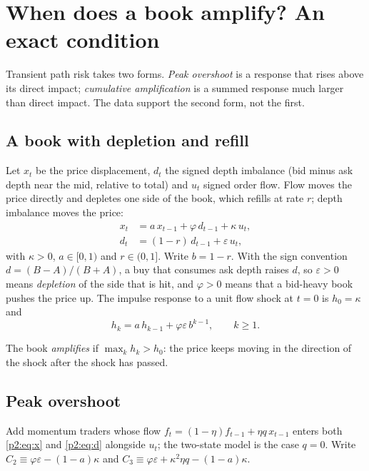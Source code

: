     \section{When does a book amplify? An exact condition}\label{p2:sec:t6}

    Transient path risk takes two forms. \emph{Peak overshoot} is a response that rises above its direct impact; \emph{cumulative amplification} is a summed response much larger than direct impact. The data support the second form, not the first.

    \subsection{A book with depletion and refill}
Let $x_t$ be the price displacement, $d_t$ the signed depth imbalance (bid minus ask depth near the mid, relative to total) and $u_t$ signed order flow. Flow moves the price directly and depletes one side of the book, which refills at rate $r$; depth imbalance moves the price:
\begin{align}
x_t &= a\,x_{t-1} + \varphi\,d_{t-1} + \kappa\,u_t, \label{p2:eq:x}\\
d_t &= (1-r)\,d_{t-1} + \varepsilon\,u_t, \label{p2:eq:d}
\end{align}
with $\kappa>0$, $a\in[0,1)$ and $r\in(0,1]$. Write $b=1-r$. With the sign convention $d=(B-A)/(B+A)$, a buy that consumes ask depth raises $d$, so $\varepsilon>0$ means \emph{depletion} of the side that is hit, and $\varphi>0$ means that a bid-heavy book pushes the price up. The impulse response to a unit flow shock at $t=0$ is $h_0=\kappa$ and
\begin{equation}\label{p2:eq:rec}
h_k=a\,h_{k-1}+\varphi\varepsilon\,b^{k-1},\qquad k\ge1.
\end{equation}

\begin{definition}
The book \emph{amplifies} if $\max_kh_k>h_0$: the price keeps moving in the direction of the shock after the shock has passed.
\end{definition}

    \subsection{Peak overshoot}
Add momentum traders whose flow $f_t=(1-\eta)f_{t-1}+\eta q\,x_{t-1}$ enters both \eqref{p2:eq:x} and \eqref{p2:eq:d} alongside $u_t$; the two-state model is the case $q=0$. Write $C_2\equiv\varphi\varepsilon-(1-a)\kappa$ and $C_3\equiv\varphi\varepsilon+\kappa^2\eta q-(1-a)\kappa$.

